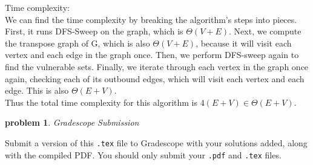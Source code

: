 \documentclass[10pt]{article}
\newtheorem{problem}{\sc\color{cit}problem}
\begin{document}
{Time complexity: \\
\null \quad We can find the time complexity by breaking the algorithm's steps into pieces. First, it runs DFS-Sweep on the graph, which is $\Theta(V+E)$. Next, we compute the transpose graph of G, which is also $\Theta(V+E)$, because it will visit each vertex and each edge in the graph once. Then, we perform DFS-sweep again to find the vulnerable sets. Finally, we iterate through each vertex in the graph once again, checking each of its outbound edges, which will visit each vertex and each edge. This is also $\Theta(E + V)$. \\ 
\null \quad Thus the total time complexity for this algorithm is $4(E+V) \in \Theta(E + V)$.
} \\

\begin{problem} Gradescope Submission \end{problem}
Submit a version of this \verb|.tex| file to Gradescope with your solutions added, along with the compiled PDF.  You should only submit your \verb|.pdf| and \verb|.tex| files.
\end{document}
